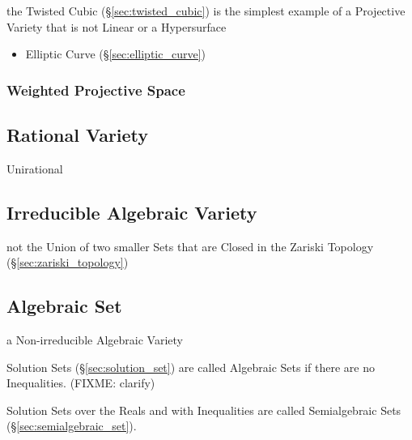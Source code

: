 the Twisted Cubic (\S\ref{sec:twisted_cubic}) is the simplest example of a
Projective Variety that is not Linear or a Hypersurface

\begin{itemize}
  \item Elliptic Curve (\S\ref{sec:elliptic_curve})
\end{itemize}



\subsubsection{Weighted Projective Space}\label{sec:weighted_projective_space}



\subsection{Rational Variety}\label{sec:rational_variety}

Unirational



\subsection{Irreducible Algebraic Variety}
\label{sec:irreducible_algebraic_variety}

not the Union of two smaller Sets that are Closed in the Zariski Topology
(\S\ref{sec:zariski_topology})



\subsection{Algebraic Set}\label{sec:algebraic_set}

a Non-irreducible Algebraic Variety

Solution Sets (\S\ref{sec:solution_set}) are called Algebraic Sets if there are
no Inequalities. (FIXME: clarify)

Solution Sets over the Reals and with Inequalities are called Semialgebraic
Sets (\S\ref{sec:semialgebraic_set}).

